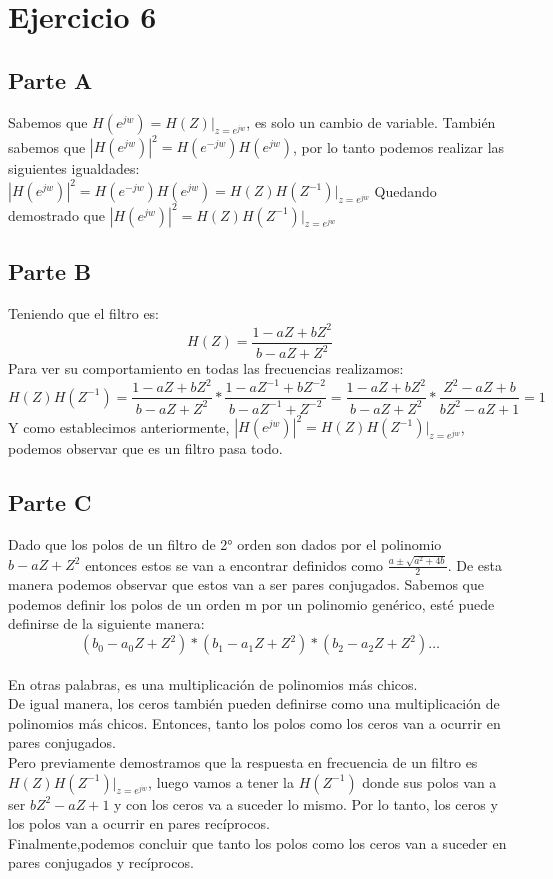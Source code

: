 \chapter*{Ejercicio 6}

\section{Parte A}

Sabemos que $H\left( e^{jw} \right)=H\left( Z \right)|_{z=e^{jw}}$, es solo un cambio de variable. También sabemos que $\left| H\left( e^{jw} \right) \right|^2= H\left( e^{-jw} \right) H\left( e^{jw} \right)$, por lo tanto podemos realizar las siguientes igualdades:\\
$\left| H\left( e^{jw} \right) \right|^2=H\left( e^{-jw} \right) H\left( e^{jw} \right)=H\left( Z \right) H\left( Z^{-1} \right)|_{z=e^{jw}}$
Quedando demostrado que $\left| H\left( e^{jw} \right) \right|^2=H\left( Z \right) H\left( Z^{-1} \right)|_{z=e^{jw}}$

\section{Parte B}
Teniendo que el filtro es:
$$H\left( Z \right)=\frac{1-aZ+bZ^2}{b-aZ+Z^2}$$
Para ver su comportamiento en todas las frecuencias realizamos:
$$H\left( Z \right)H\left( Z^{-1} \right)=\frac{1-aZ+bZ^2}{b-aZ+Z^2}* \frac{1-aZ^{-1}+bZ^{-2}}{b-aZ^{-1}+Z^{-2}}=\frac{1-aZ+bZ^2}{b-aZ+Z^2}* \frac{Z^{2}-aZ+b}{bZ^{2}-aZ+1}=1$$
Y como establecimos anteriormente, $\left| H\left( e^{jw} \right) \right|^2=H\left( Z \right) H\left( Z^{-1} \right)|_{z=e^{jw}}$, podemos observar que es un filtro pasa todo.

\section{Parte C}
Dado que los polos de un filtro de 2° orden son dados por el polinomio $b-aZ+Z^2$ entonces estos se van a encontrar definidos como $\frac{a \pm \sqrt{a^2+ 4b}}{2}$. De esta manera podemos observar que estos van a ser pares conjugados. Sabemos que podemos definir los polos de un orden m por un polinomio genérico, esté puede definirse de la siguiente manera: 
$$\left( b_0-a_0Z+Z^2 \right)*\left( b_1-a_1Z+Z^2 \right)*\left( b_2-a_2Z+Z^2 \right)\dots$$\\
En otras palabras, es una multiplicación de polinomios más chicos.\\
De igual manera, los ceros también pueden definirse como una multiplicación de polinomios más chicos. Entonces, tanto los polos como los ceros van a ocurrir en pares conjugados.\\
Pero previamente demostramos  que la respuesta en frecuencia de un filtro es $H\left( Z \right) H\left( Z^{-1} \right)|_{z=e^{jw}}$, luego vamos a tener la $H\left( Z^{-1} \right)$ donde sus polos van a ser $bZ^2-aZ+1$ y con los ceros va a suceder lo mismo. Por lo tanto, los ceros y los polos van a ocurrir en pares recíprocos.\\
Finalmente,podemos concluir que tanto los polos como los ceros van a suceder en pares conjugados y recíprocos.